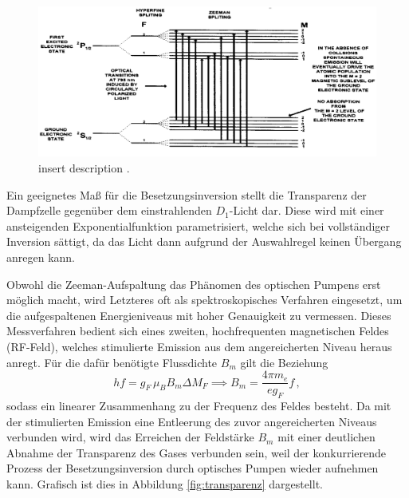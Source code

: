   \begin{figure}
    \centering
    \includegraphics[width=\textwidth]{pictures/pumpschema.png}
    \caption{insert description \cite{stehendeWelle}.}
    \label{fig:pumpschema}
  \end{figure}

  Ein geeignetes Maß für die Besetzungsinversion stellt die Transparenz der Dampfzelle gegenüber dem einstrahlenden $D_1$-Licht dar. Diese wird mit einer ansteigenden Exponentialfunktion parametrisiert, welche sich bei vollständiger Inversion sättigt, da das Licht dann aufgrund der Auswahlregel keinen Übergang anregen kann.

  \cite{insert Bild?}

  \cite{FRAGE: EINFACH IMMER GROßBUCHSTABEN FÜR DIE QUANTENZAHLEN, SO WIE IN DER ALTEN ANLEITUNG?}

  Obwohl die Zeeman-Aufspaltung das Phänomen des optischen Pumpens erst möglich macht, wird Letzteres oft als spektroskopisches Verfahren eingesetzt, um die aufgespaltenen Energieniveaus mit hoher Genauigkeit zu vermessen. Dieses Messverfahren bedient sich eines zweiten, hochfrequenten magnetischen Feldes (RF-Feld), welches stimulierte Emission aus dem angereicherten Niveau heraus anregt. Für die dafür benötigte Flussdichte $B_m$ gilt die Beziehung
  \begin{equation}
    h f = g_F \, \mu_B B_m \Delta M_F \implies B_m = \frac{4 \pi m_e}{e g_F} f\,,
    \label{eqn:B_M_Theorie}
  \end{equation}
  sodass ein linearer Zusammenhang zu der Frequenz des Feldes besteht.
  Da mit der stimulierten Emission eine Entleerung des zuvor angereicherten Niveaus verbunden wird, wird das Erreichen der Feldstärke $B_m$ mit einer deutlichen Abnahme der Transparenz des Gases verbunden sein, weil der konkurrierende Prozess der Besetzungsinversion durch optisches Pumpen wieder aufnehmen kann. Grafisch ist dies in Abbildung \ref{fig:transparenz} dargestellt.


